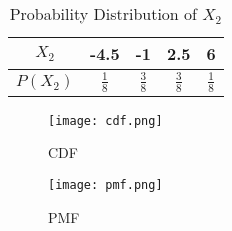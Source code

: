 \documentclass[11pt,a4paper,twocolumn]{article}
\begin{document}
\begin{table}[h!]
    \centering
    \begin{tabular}{|c|c|c|c|c|}
    \hline
         $X_{2}$&-4.5&-1&2.5&6  \\
         \hline
         $P(X_{2})$&$\frac{1}{8}$&$\frac{3}{8}$&$\frac{3}{8}$&$\frac{1}{8}$\\
         \hline
    \end{tabular}
    \caption{Probability Distribution of $X_{2}$}
    \label{tab:my_label}
\end{table}
\begin{figure}[h!]
    \centering
    \texttt{[image: cdf.png]}
    \caption{CDF}
    \label{fig:my_label}
\end{figure}
\begin{figure}[h!]
    \centering
    \texttt{[image: pmf.png]}
    \caption{PMF}
    \label{fig:my_label}
\end{figure}
\end{document}
